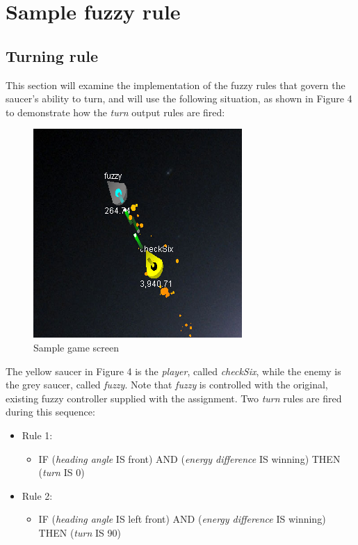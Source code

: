 \newpage

\section{Sample fuzzy rule}

\subsection{Turning rule}

This section will examine the implementation of the fuzzy rules that govern the saucer's ability to turn, and will use the following situation, as shown in Figure 4 to demonstrate how the \emph{turn} output rules are fired:

\begin{figure}[H]
\centering
\caption{Sample game screen}
\includegraphics[scale=1]{./img/png/gameScreen.png}
\end{figure}

The yellow saucer in Figure 4 is the \emph{player}, called \emph{checkSix}, while the enemy is the grey saucer, called \emph{fuzzy}. Note that \emph{fuzzy} is controlled with the original, existing fuzzy controller supplied with the assignment. Two \emph{turn} rules are fired during this sequence:

\begin{itemize}
	\item Rule 1:
		\begin{itemize}
			\item IF (\emph{heading angle} IS front) AND (\emph{energy difference} IS winning) THEN (\emph{turn} IS 0)
		\end{itemize}	 
	\item Rule 2:
		\begin{itemize}
			\item IF (\emph{heading angle} IS left front) AND (\emph{energy difference} IS winning) THEN (\emph{turn} IS 90)
		\end{itemize}
\end{itemize}


